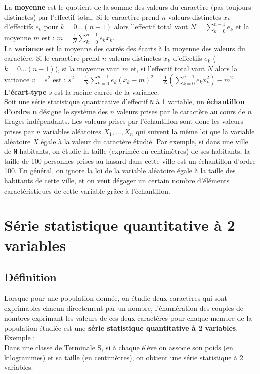 \documentclass[a4paper,11pt]{book}
\begin{document}
La {\bf moyenne} est le quotient de la somme des valeurs du caract\`ere (pas
toujours distinctes) par l'effectif total.
Si le caract\`ere prend $n$ valeurs distinctes $x_k$ d'effectifs $e_k$ pour
$k=0...(n-1)$ alors l'effectif total vaut $N=\sum_{k=0}^{n-1} e_k$ et 
la moyenne $m$ est :
$\displaystyle m=\frac{1}{N}\sum_{k=0}^{n-1} e_kx_k$.\\
La {\bf variance} est la moyenne des carr\'es des \'ecarts \`a la moyenne des 
valeurs du caract\`ere.
Si le caract\`ere prend $n$ valeurs distinctes $x_k$ d'effectifs $e_k$ 
($k=0...(n-1)$), si la moyenne vaut $m$ et, si l'effectif total vaut $N$ alors
 la variance $v=s^2$ est :
$\displaystyle s^2=\frac{1}{N}\sum_{k=0}^{n-1} e_k(x_k-m)^2=\frac{1}{N}(\sum_{k=0}^{n-1} e_kx_k^2)-m^2$.\\
L'{\bf \'ecart-type} $s$ est la racine carr\'ee de la variance.\\
Soit une s\'erie statistique quantitative d'effectif {\tt N} \`a 1 variable, 
un {\bf \'echantillon d'ordre n} d\'esigne le syst\`eme des $n$ valeurs 
prises par le caract\`ere au cours de $n$ tirages ind\'ependants. Les valeurs 
prises par l'\'echantillon sont donc les valeurs prises par $n$ variables 
al\'eatoires $X_1,...,X_n$ qui suivent la m\^eme loi que la variable 
al\'eatoire $X$ \'egale \`a la valeur du caract\`ere \'etudi\'e.
Par exemple, si dans une ville de {\tt N} habitants, on \'etudie la taille 
(exprim\'ee en centim\`etres) de ses habitants, la taille de 100 personnes 
prises au hasard dans cette ville est un \'echantillon d'ordre 100.
En g\'en\'eral, on ignore la loi de la variable al\'eatoire \'egale \`a la 
taille des habitants de cette ville, et on veut 
d\'egager un certain nombre d'\'el\'ements caract\'eristiques de cette variable
 gr\^ace \`a l'\'echantillon.
\section{S\'erie statistique quantitative \`a 2 variables}
\subsection{D\'efinition}
Lorsque pour une population donn\'ee, on \'etudie deux caract\`eres qui sont
exprimables chacun directement par un nombre, 
l'\'enum\'eration des couples de nombres exprimant les valeurs de ces deux 
caract\`eres pour chaque
membre de la population \'etudi\`ee est une 
{\bf s\'erie statistique quantitative \`a 2 variables}.\\
Exemple :\\
Dans une classe de Terminale S, si \`a chaque \'el\`eve on associe son poids 
(en kilogrammes) et sa taille (en centim\`etres), on obtient une 
s\'erie statistique \`a 2 variables. 
\end{document}
